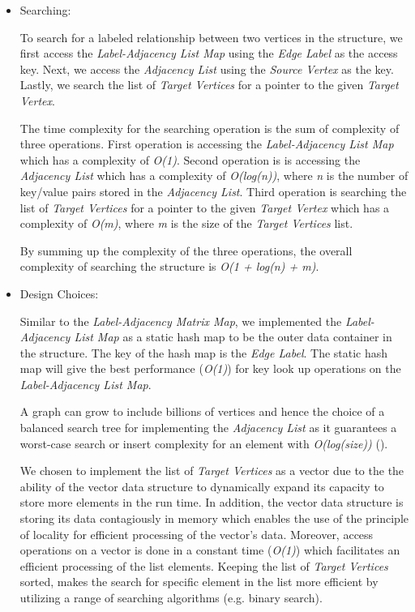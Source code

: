 {\begin{itemize}
\item{Searching:}

To search for a labeled relationship between two vertices in the structure, we first access the \textit{Label-Adjacency List Map} using the \textit{Edge Label} as the access key. Next, we access the \textit{Adjacency List} using the \textit{Source Vertex} as the key. Lastly, we search the list of \textit{Target Vertices} for a pointer to the given \textit{Target Vertex}.

The time complexity for the searching operation is the sum of complexity of three operations. First operation is accessing the \textit{Label-Adjacency List Map} which has a complexity of \textit{O(1)}. Second operation is is accessing the \textit{Adjacency List} which has a complexity of \textit{O(log(n))}, where \textit{n} is the number of key/value pairs stored in the \textit{Adjacency List}. Third operation is searching the list of \textit{Target Vertices} for a pointer to the given \textit{Target Vertex} which has a complexity of \textit{O(m)}, where \textit{m} is the size of the \textit{Target Vertices} list.

By summing up the complexity of the three operations, the overall complexity of searching the structure is \textit{O(1 + log(n) + m)}.

\item{Design Choices:}

Similar to the \textit{Label-Adjacency Matrix Map}, we implemented the \textit{Label-Adjacency List Map} as a static hash map to be the outer data container in the structure. The key of the hash map is the \textit{Edge Label}. The static hash map will give the best performance (\textit{O(1)}) for key look up operations on the \textit{Label-Adjacency List Map}.

A graph can grow to include billions of vertices and hence the choice of a balanced search tree for implementing the \textit{Adjacency List} as it guarantees a worst-case search or insert complexity for an element with \textit{O(log(size))}
(\cite{NSA}).

We chosen to implement the list of \textit{Target Vertices} as a vector due to the the ability of the vector data structure to dynamically expand its capacity to store more elements in the run time. In addition, the vector data structure is storing its data contagiously in memory which enables the use of the principle of locality for efficient processing of the vector's data. Moreover, access operations on a vector is done in a constant time (\textit{O(1)}) which facilitates an efficient processing of the list elements. Keeping the list of \textit{Target Vertices} sorted, makes the search for specific element in the list more efficient by utilizing a range of searching algorithms (e.g. binary search).


\end{itemize}}

